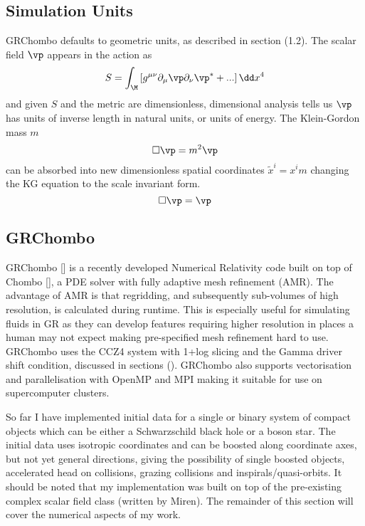 \subsection{Simulation Units}
GRChombo defaults to geometric units, as described in section (1.2). The scalar field $\vp$ appears in the action as
\[ S = \int_{\M} \left[g^{\mu\nu}\partial_\mu \vp \partial_\nu \vp^* + ... \right]\dd x^4\]
and given $S$ and the metric are dimensionless, dimensional analysis tells us $\vp$ has units of inverse length in natural units, or units of energy. The Klein-Gordon mass $m$
\[ \Box \vp = m^2 \vp\]
can be absorbed into new dimensionless spatial coordinates $\tilde{x}^i = x^i m$ changing the KG equation to the scale invariant form.
\[ \Box \vp = \vp\]
\subsection{GRChombo}
GRChombo [] is a recently developed Numerical Relativity code built on top of Chombo [], a PDE solver with fully adaptive mesh refinement (AMR). The advantage of AMR is that regridding, and subsequently sub-volumes of high resolution, is calculated during runtime. This is especially useful for simulating fluids in GR as they can develop features requiring higher resolution in places a human may not expect making pre-specified mesh refinement hard to use. GRChombo uses the CCZ4 system with 1+log slicing and the Gamma driver shift condition, discussed in sections (). GRChombo also supports vectorisation and parallelisation with OpenMP and MPI making it suitable for use on supercomputer clusters. 

So far I have implemented initial data for a single or binary system of compact objects which can be either a Schwarzschild black hole or a boson star. The initial data uses isotropic coordinates and can be boosted along coordinate axes, but not yet general directions, giving the possibility of single boosted objects, accelerated head on collisions, grazing collisions and inspirals/quasi-orbits. It should be noted that my implementation was built on top of the pre-existing complex scalar field class (written by Miren). The remainder of this section will cover the numerical aspects of my work.

